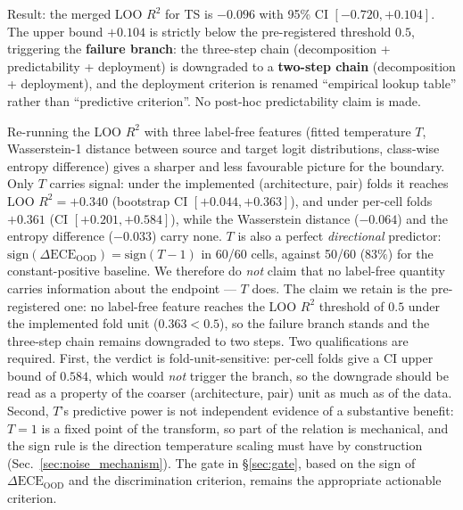 \documentclass[review,12pt,nonatbib]{elsarticle}
\begin{document}
Result: the merged LOO $R^2$ for TS is $-0.096$ with 95\% CI
$[-0.720, +0.104]$. The upper bound $+0.104$ is strictly below the
pre-registered threshold $0.5$, triggering the \textbf{failure
branch}: the three-step chain (decomposition + predictability +
deployment) is downgraded to a \textbf{two-step chain} (decomposition
+ deployment), and the deployment criterion is renamed ``empirical
lookup table'' rather than ``predictive criterion''. No post-hoc
predictability claim is made.

Re-running the LOO
$R^2$ with three label-free features (fitted temperature $T$,
Wasserstein-1 distance between source and target logit distributions,
class-wise entropy difference) gives a sharper and less favourable
picture for the boundary. Only $T$ carries signal: under the
implemented (architecture, pair) folds it reaches LOO $R^2 = +0.340$
(bootstrap CI $[+0.044, +0.363]$), and under per-cell folds $+0.361$
(CI $[+0.201, +0.584]$), while the Wasserstein distance ($-0.064$) and
the entropy difference ($-0.033$) carry none. $T$ is also a perfect
\emph{directional} predictor:
$\mathrm{sign}(\Delta\text{ECE}_{\text{OOD}}) = \mathrm{sign}(T-1)$ in
60/60 cells, against 50/60 ($83\%$) for the constant-positive baseline.
We therefore do \emph{not} claim that no label-free quantity carries
information about the endpoint --- $T$ does. The claim we retain is the
pre-registered one: no label-free feature reaches the LOO $R^2$
threshold of $0.5$ under the implemented fold unit ($0.363 < 0.5$), so
the failure branch stands and the three-step chain remains downgraded to
two steps. Two qualifications are required. First, the verdict is
fold-unit-sensitive: per-cell folds give a CI upper bound of $0.584$,
which would \emph{not} trigger the branch, so the downgrade should be
read as a property of the coarser (architecture, pair) unit as much as
of the data. Second, $T$'s predictive power is not independent evidence
of a substantive benefit: $T=1$ is a fixed point of the transform, so
part of the relation is mechanical, and the sign rule is the direction
temperature scaling must have by construction
(Sec.~\ref{sec:noise_mechanism}). The gate in \S\ref{sec:gate}, based on
the sign of $\Delta\text{ECE}_{\text{OOD}}$ and the discrimination
criterion, remains the appropriate actionable criterion.
\end{document}
